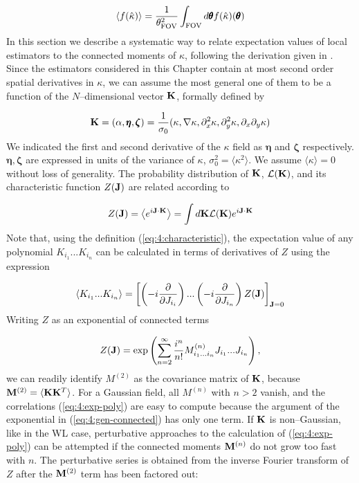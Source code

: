 \begin{equation}
\label{eq:4:average-real}
\langle f(\hat{\kappa})\rangle = \frac{1}{\theta^2_{\rm FOV}}\int_{\rm FOV}d\pmb{\theta} f(\hat{\kappa})(\pmb{\theta}) 
\end{equation}
%
In this section we describe a systematic way to relate expectation values of local estimators to the connected moments of $\kappa$, following the derivation given in \citep{MatsubaraLong}. Since the estimators considered in this Chapter contain at most second order spatial derivatives in $\kappa$, we can assume the most general one of them to be a function of the $N$--dimensional vector $\mathbf{K}$, formally defined by

\begin{equation}
\label{eq:4:lcl-vec}
\mathbf{K} = (\alpha,\pmb{\eta},\pmb{\zeta}) = \frac{1}{\sigma_0}(\kappa,\nabla \kappa,\partial^2_x\kappa,\partial^2_y\kappa,\partial_x\partial_y\kappa)
\end{equation}
%
We indicated the first and second derivative of the $\kappa$ field as $\pmb{\eta}$ and $\pmb{\zeta}$ respectively. $\pmb{\eta},\pmb{\zeta}$ are expressed in units of the variance of $\kappa$, $\sigma_0^2=\langle\kappa^2\rangle$. We assume $\langle\kappa\rangle=0$ without loss of generality. The probability distribution of $\mathbf{K}$, $\mathcal{L}(\mathbf{K})$, and its characteristic function $Z(\mathbf{J})$ are related according to 

\begin{equation}
\label{eq:4:characteristic}
Z(\mathbf{J}) = \left\langle e^{i\mathbf{J}\cdot\mathbf{K}}\right\rangle = \int d\mathbf{K}\mathcal{L}(\mathbf{K})e^{i\mathbf{J}\cdot\mathbf{K}}
\end{equation} 
%
Note that, using the definition (\ref{eq:4:characteristic}), the expectation value of any polynomial $K_{i_1}...K_{i_n}$ can be calculated in terms of derivatives of $Z$ using the expression

\begin{equation}
\label{eq:4:exp-poly}
\left\langle K_{i_1}...K_{i_n}\right\rangle = \left[\left(-i\frac{\partial}{\partial J_{i_i}}\right)...\left(-i\frac{\partial}{\partial J_{i_n}}\right)Z(\mathbf{J})\right]_{\mathbf{J}=0}
\end{equation}
%
Writing $Z$ as an exponential of connected terms

\begin{equation}
\label{eq:4:gen-connected}
Z(\mathbf{J}) = \exp\left(\sum_{n=2}^\infty\frac{i^n}{n!}M^{(n)}_{i_1...i_n}J_{i_1}...J_{i_n}\right),
\end{equation}
%
we can readily identify $M^{(2)}$ as the covariance matrix of $\mathbf{K}$, because $\mathbf{M}^{(2)}=\langle\mathbf{K}\mathbf{K}^T\rangle$. For a Gaussian field, all $M^{(n)}$ with $n>2$ vanish, and the correlations (\ref{eq:4:exp-poly}) are easy to compute because the argument of the exponential in (\ref{eq:4:gen-connected}) has only one term. If $\mathbf{K}$ is non--Gaussian, like in the WL case, perturbative approaches to the calculation of (\ref{eq:4:exp-poly}) can be attempted if the connected moments $\mathbf{M}^{(n)}$ do not grow too fast with $n$. The perturbative series is obtained from the inverse Fourier transform of $Z$ after the $\mathbf{M}^{(2)}$ term has been factored out: 

